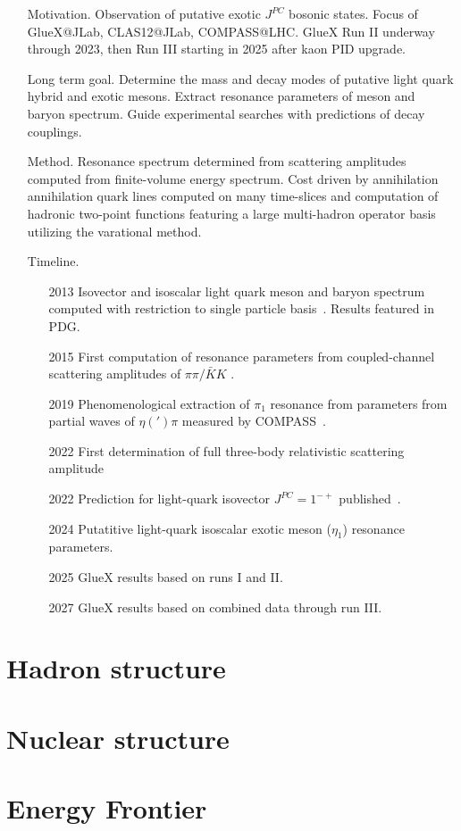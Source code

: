 \documentclass{article}
\begin{document}
\begin{itemize}
    \item[Motivation.] Observation of putative exotic $J^{PC}$ bosonic
      states. Focus of GlueX@JLab, CLAS12@JLab, COMPASS@LHC. GlueX Run
      II underway through 2023, then Run III starting in 2025 after
      kaon 
PID upgrade.
    \item[Long term goal.] Determine the mass and decay modes of
      putative light quark hybrid and exotic mesons. Extract resonance
      parameters of meson and baryon spectrum. Guide experimental
      searches with predictions of decay couplings.
    \item[Method.] Resonance spectrum determined from scattering
      amplitudes computed from finite-volume energy spectrum. Cost
      driven by annihilation annihilation quark lines computed on many
      time-slices and computation of hadronic two-point functions
      featuring a large multi-hadron operator basis utilizing the varational method. 
\item[Timeline.]
\begin{itemize}
    \item[2013] Isovector and isoscalar light quark meson and baryon
      spectrum computed with restriction to single particle basis~\cite{Dudek:2013yja}. Results featured in PDG.
    \item[2015] First computation of resonance parameters from coupled-channel scattering
      amplitudes of $\pi\pi/\bar{K}K$ \cite{Wilson:2015dqa}.
    \item[2019] Phenomenological extraction of $\pi_1$ resonance from 
      parameters from partial waves of $\eta(')\pi$ measured by COMPASS~\cite{JPAC:2018zyd}.
    \item[2022] First determination of full three-body relativistic scattering amplitude~\cite{Hansen:2020otl}
    \item[2022] Prediction for light-quark isovector $J^{PC}=1^{-+}$ published~\cite{Woss:2020ayi}.
    \item[2024] Putatitive light-quark isoscalar exotic meson ($\eta_1$)  resonance parameters.
    \item[2025] GlueX results based on runs I and II. 
    \item[2027] GlueX results based on combined data through run III.
\end{itemize}
\end{itemize}


\section{Hadron structure}\label{sec:hadstruct}


\section{Nuclear structure}\label{sec:nucstruct}



\section{Energy Frontier}\label{sec:energy}






\end{document}
